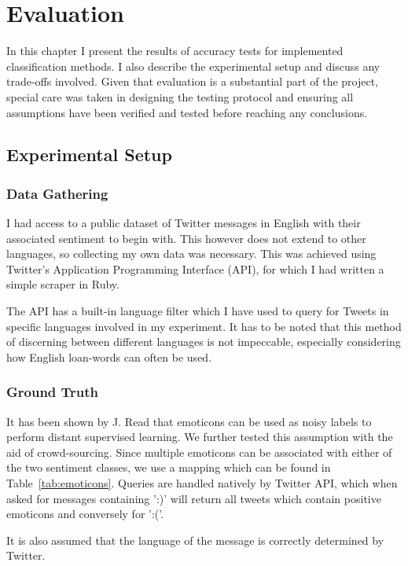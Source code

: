 \chapter{Evaluation}

In this chapter I present the results of accuracy tests for implemented classification methods. I also describe the experimental setup and discuss any trade-offs involved. Given that evaluation is a substantial part of the project, special care was taken in designing the testing protocol and ensuring all assumptions have been verified and tested before reaching any conclusions.

\section{Experimental Setup}

\subsection{Data Gathering}

I had access to a public dataset of Twitter messages in English with their associated sentiment to begin with. This however does not extend to other languages, so collecting my own data was necessary. This was achieved using Twitter's Application Programming Interface (API), for which I had written a simple scraper in Ruby.

The API has a built-in language filter which I have used to query for Tweets in specific languages involved in my experiment. It has to be noted that this method of discerning between different languages is not impeccable, especially considering how English loan-words can often be used.

\subsection{Ground Truth}

It has been shown by J. Read \cite{Emoticons} that emoticons can be used as noisy labels to perform distant supervised learning. We further tested this assumption with the aid of crowd-sourcing. Since multiple emoticons can be associated with either of the two sentiment classes, we use a mapping which can be found in Table~\ref{tab:emoticons}. Queries are handled natively by Twitter API, which when asked for messages containing ':)' will return all tweets which contain positive emoticons and conversely for ':('.

It is also assumed that the language of the message is correctly determined by Twitter.

